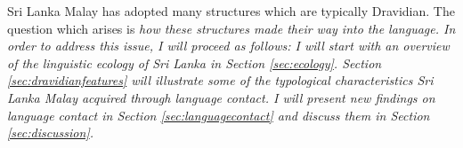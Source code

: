 \documentclass{article}
\begin{document}
Sri Lanka Malay has adopted many structures which are typically Dravidian. The question which arises is \em how \em these structures made their way into the language. In order to address this issue, I will proceed as follows: 
I will start with an overview of the linguistic ecology of Sri Lanka in Section \ref{sec:ecology}.
Section \ref{sec:dravidianfeatures} will illustrate some of the typological characteristics Sri Lanka Malay acquired through language contact.
I will present new findings on language contact in Section \ref{sec:languagecontact} 
and discuss them in Section \ref{sec:discussion}.


% 
% 
% 
\end{document}
